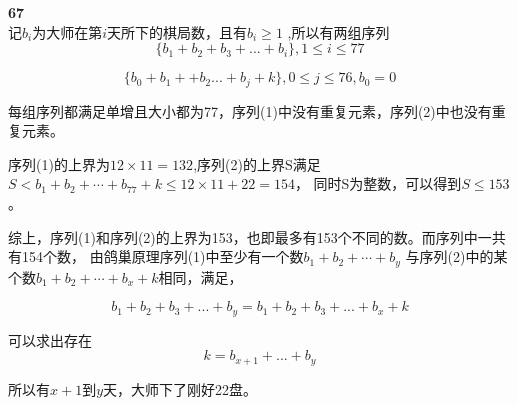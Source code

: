 \documentclass[UTF8]{ctexart}
\begin{document}
\noindent\textbf{67}\\

记$b_i$为大师在第$i$天所下的棋局数，且有$b_i\ge 1$ ,所以有两组序列\\
\begin{equation}
\{b_1+b_2+b_3+...+b_i\}, 1\le i \le 77
\end{equation}

\begin{equation}
\{b_0+b_1++b_2...+b_j+k\}, 0\le j \le 76 , b_0=0
\end{equation}

每组序列都满足单增且大小都为77，序列(1)中没有重复元素，序列(2)中也没有重复元素。

序列(1)的上界为$12 \times 11 = 132$,序列(2)的上界S满足$S < b_1+b_2 + \cdots + b_{77} + k \le 12 \times 11 + 22 = 154$， 同时S为整数，可以得到$S \le 153$。

综上，序列(1)和序列(2)的上界为153，也即最多有153个不同的数。而序列中一共有154个数， 由鸽巢原理序列(1)中至少有一个数$b_1+b_2 + \cdots + b_y$ 与序列(2)中的某个数$b_1+b_2 + \cdots + b_x+k$相同，满足，

$$b_1+b_2+b_3+...+b_y=b_1+b_2+b_3+...+b_x+k$$

可以求出存在
$$k=b_{x+1}+...+b_y$$

所以有$x+1$到$y$天，大师下了刚好22盘。
\end{document}
